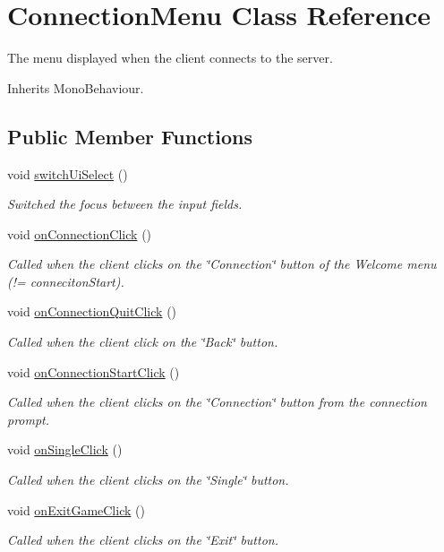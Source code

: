 \hypertarget{class_connection_menu}{\section{Connection\-Menu Class Reference}
\label{class_connection_menu}
}


The menu displayed when the client connects to the server. 




Inherits Mono\-Behaviour.

\subsection*{Public Member Functions}
\begin{DoxyCompactItemize}
\item 
void \hyperlink{class_connection_menu_adf6a50cc670ecd974d07a2dbfdfdb189}{switch\-Ui\-Select} ()
\begin{DoxyCompactList}\small\item\em Switched the focus between the input fields.\end{DoxyCompactList}\item 
void \hyperlink{class_connection_menu_a290d669ac8669f3487234b0f44db2959}{on\-Connection\-Click} ()
\begin{DoxyCompactList}\small\item\em Called when the client clicks on the \char`\"{}\-Connection\char`\"{} button of the Welcome menu (!= conneciton\-Start).\end{DoxyCompactList}\item 
void \hyperlink{class_connection_menu_ae0f28d3a32e99ee2b70f01a554f2670f}{on\-Connection\-Quit\-Click} ()
\begin{DoxyCompactList}\small\item\em Called when the client click on the \char`\"{}\-Back\char`\"{} button.\end{DoxyCompactList}\item 
void \hyperlink{class_connection_menu_afae56684f1cd637ac1938b88532e5a91}{on\-Connection\-Start\-Click} ()
\begin{DoxyCompactList}\small\item\em Called when the client clicks on the \char`\"{}\-Connection\char`\"{} button from the connection prompt.\end{DoxyCompactList}\item 
void \hyperlink{class_connection_menu_a7d1efb37315a138c6be480f011f706f7}{on\-Single\-Click} ()
\begin{DoxyCompactList}\small\item\em Called when the client clicks on the \char`\"{}\-Single\char`\"{} button.\end{DoxyCompactList}\item 
void \hyperlink{class_connection_menu_aeaa9d17bc4a78ba6acb6649876cd57d3}{on\-Exit\-Game\-Click} ()
\begin{DoxyCompactList}\small\item\em Called when the client clicks on the \char`\"{}\-Exit\char`\"{} button.\end{DoxyCompactList}\end{DoxyCompactItemize}
